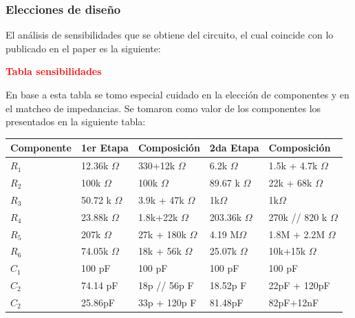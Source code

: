 \subsubsection{Elecciones de diseño}
El análisis de sensibilidades que se obtiene del circuito, el cual coincide con lo publicado en el paper es la siguiente: 
\begin{center}
	\huge{\textcolor{red}{\textbf{Tabla sensibilidades}}}
\end{center}
En base a esta tabla se tomo especial cuidado en la elección de componentes y en el matcheo de impedancias.
Se tomaron como valor de los componentes los presentados en la siguiente tabla:
\begin{table}[H]
\centering
\begin{tabular}{lllll}
\multicolumn{1}{c}{Componente} & \multicolumn{1}{c}{1er Etapa} & \multicolumn{1}{c}{Composición} & 2da Etapa        & Composición            \\ \hline
$R_1$                          & 12.36k $\Omega$               & 330+12k $\Omega$                & 6.2k $\Omega$    & 1.5k + 4.7k $\Omega$   \\
$R_2$                          & 100k $\Omega$                 & 100k $\Omega$                   & 89.67 k $\Omega$ & 22k + 68k $\Omega$     \\
$R_3$                          & 50.72 k $\Omega$              & 3.9k + 47k $\Omega$             & 1k$\Omega$       & 1k$\Omega$             \\
$R_4$                          & 23.88k $\Omega$               & 1.8k+22k $\Omega$               & 203.36k $\Omega$ & 270k // 820 k $\Omega$ \\
$R_5$                          & 207k $\Omega$                 & 27k + 180k $\Omega$             & 4.19 M$\Omega$   & 1.8M + 2.2M $\Omega$   \\
$R_6$                          & 74.05k $\Omega$               & 18k + 56k $\Omega$              & 25.07k $\Omega$  & 10k+15k $\Omega$       \\
$C_1$                          & 100 pF                        & 100 pF                          & 100 pF           & 100 pF                 \\
$C_2$                          & 74.14 pF                      & 18p // 56p F                    & 18.52p F         & 22pF + 120pF           \\
$C_2$                          & 25.86pF                       & 33p + 120p F                    & 81.48pF          & 82pF+12nF             
\end{tabular}
\end{table}


